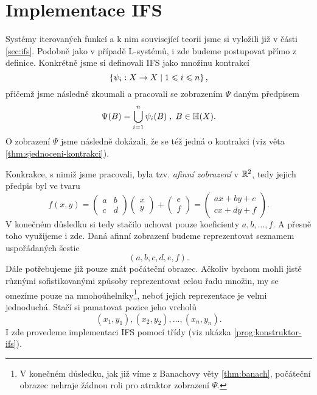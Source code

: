 \section{Implementace IFS}\label{sec:implementace-ifs}

Systémy iterovaných funkcí a k nim související teorii jsme si vyložili již v části \ref{sec:ifs}. Podobně jako v případě L-systémů, i zde budeme postupovat přímo z definice. Konkrétně jsme si definovali IFS jako množinu kontrakcí
\[\left\{\psi_i:X \rightarrow X\mid 1\leqslant i \leqslant n\right\},\]
přičemž jsme následně zkoumali a pracovali se zobrazením $\Psi$ daným předpisem
\[\Psi(B)=\bigcup_{i=1}^n\psi_i(B)\;,\;B\in\mathbb{H}(X).\]
O zobrazení $\Psi$ jsme následně dokázali, že se též jedná o kontrakci (viz věta \ref{thm:sjednoceni-kontrakci}).

Konkrakce, s nimiž jsme pracovali, byla tzv. \emph{afinní zobrazení} v $\mathbb{R}^2$, tedy jejich předpis byl ve tvaru
\begin{equation}\label{eq:afinni-zobrazeni}
    f(x,y)=\left(\begin{matrix}
        a & b\\
        c & d
    \end{matrix}\right)\left(\begin{matrix}
        x\\
        y
    \end{matrix}\right)+\left(\begin{matrix}
        e\\
        f
    \end{matrix}\right)=\left(\begin{matrix}
        ax+by+e\\
        cx+dy+f
    \end{matrix}\right).
\end{equation}
V konečném důsledku si tedy stačilo uchovat pouze koeficienty $a,b,\ldots,f$. A přesně toho využijeme i zde. Daná afinní zobrazení budeme reprezentovat seznamem uspořádaných šestic
\[(a,b,c,d,e,f).\]
Dále potřebujeme již pouze znát počáteční obrazec. Ačkoliv bychom mohli jistě různými sofistikovanými způsoby reprezentovat celou řadu množin, my se omezíme pouze na mnohoúhelníky\footnote{V konečném důsledku, jak již víme z Banachovy věty \ref{thm:banach}, počáteční obrazec nehraje žádnou roli pro atraktor zobrazení $\Psi$.}, neboť jejich reprezentace je velmi jednoduchá. Stačí si pamatovat pozice jeho vrcholů
\[(x_1,y_1),(x_2,y_2),\ldots,(x_n,y_n).\]
I zde provedeme implementaci IFS pomocí třídy (viz ukázka \ref{prog:konstruktor-ifs}).
